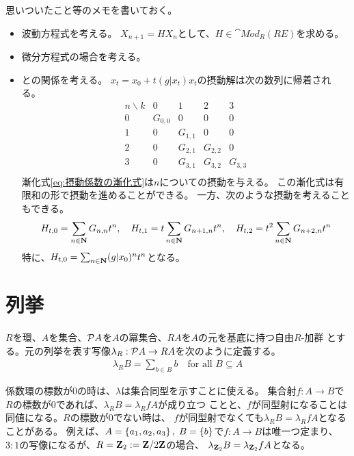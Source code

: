 {	\begin{todo}[課題]\label{todo:課題} %
		思いついたこと等のメモを書いておく。
		\begin{itemize}\setlength{\itemsep}{-1mm} %
			\item 波動方程式を考える。
			$X_{n+1}=HX_n$として、$H\in\cat{Mod}_R(RE)$を求める。
			\item 微分方程式の場合を考える。
			\item \cite{Hopkins99}との関係を考える。
			$x_t=x_0+t(g|x_t)x_t$の摂動解は次の数列に帰着される。
			\begin{equation*}\begin{array}{r|ccccc}
				n\backslash k & 0 & 1 & 2 & 3 \\\hline
				0 & G_{0,0} & 0 & 0 & 0 \\
				1 & 0 & G_{1,1} & 0 & 0 \\
				2 & 0 & G_{2,1} & G_{2,2} & 0 \\
				3 & 0 & G_{3,1} & G_{3,2} & G_{3,3} \\
			\end{array}\end{equation*}
			漸化式\eqref{eq:摂動係数の漸化式}は$n$についての摂動を与える。
			この漸化式は有限和の形で摂動を進めることができる。
			一方、次のような摂動を考えることもできる。
			\begin{equation*}\begin{split}
				H_{t,0} = \sum_{n\in\mathbf{N}} G_{n,n}t^n,\quad
				H_{t,1} = t\sum_{n\in\mathbf{N}} G_{n+1,n}t^n ,\quad
				H_{t,2} = t^2\sum_{n\in\mathbf{N}} G_{n+2,n}t^n 
			\end{split}\end{equation*}
			特に、$H_{t,0}=\sum_{n\in\mathbf{N}}(g|x_0)^nt^n$となる。
		\end{itemize} %
	\end{todo} %
\section{列挙}\label{s1:列挙} %
	$R$を環、$A$を集合、${\mathcal{P}} A$を$A$の冪集合、$RA$を$A$の元を基底に持つ自由$R$-加群
	とする。元の列挙を表す写像$\lambda_R:{\mathcal{P}} A\to RA$を次のように定義する。
	\begin{equation*}\begin{split}
		\lambda_R B = \sum_{b\in B}b \quad\text{for all } B\subseteq A
	\end{split}\end{equation*}

	係数環の標数が$0$の時は、$\lambda$は集合同型を示すことに使える。
	集合射$f:A\to B$で$R$の標数が$0$であれば、$\lambda_RB=\lambda_RfA$が成り立つ
	ことと、$f$が同型射になることは同値になる。$R$の標数が$0$でない時は、
	$f$が同型射でなくても$\lambda_RB=\lambda_RfA$となることがある。
	例えば、$A=\mathinner{\{{a_1,a_2,a_3}\}},\;B=\mathinner{\{{b}\}}$で$f:A\to B$は唯一つ定まり、
	$3:1$の写像になるが、$R=\mathbf{Z}_2:=\mathbf{Z}/2\mathbf{Z}$の場合、
	$\lambda_{\mathbf{Z}_2}B=\lambda_{\mathbf{Z}_2}fA$となる。

}
